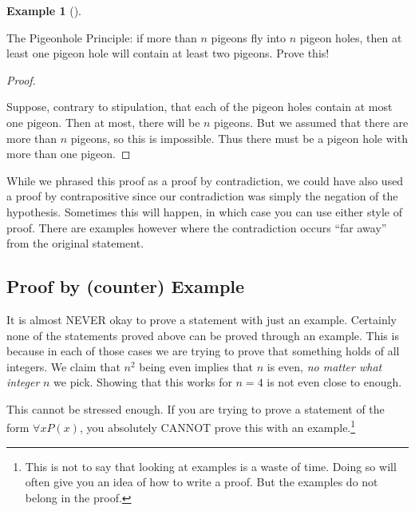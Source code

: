 \documentclass[10pt,]{book}
\theoremstyle{plain}
\theoremstyle{definition}
\newtheorem{example}[theorem]{Example}
\theoremstyle{definition}
\theoremstyle{definition}
\numberwithin{equation}{chapter}
\begin{document}
\begin{example}[]\label{example-96}

The Pigeonhole Principle: if more than \(n\) pigeons fly into \(n\) pigeon holes, then at least one pigeon hole will contain at least two pigeons. Prove this!
%
\begin{proof}\hypertarget{proof-40}{}

Suppose, contrary to stipulation, that each of the pigeon holes contain at most one pigeon. Then at most, there will be \(n\) pigeons. But we assumed that there are more than \(n\) pigeons, so this is impossible. Thus there must be a pigeon hole with more than one pigeon.
%
\end{proof}
\par

While we phrased this proof as a proof by contradiction, we could have also used a proof by contrapositive since our contradiction was simply the negation of the hypothesis. Sometimes this will happen, in which case you can use either style of proof. There are examples however where the contradiction occurs ``far away'' from the original statement.
%
\end{example}
\typeout{************************************************}
\typeout{************************************************}
\subsection[Proof by (counter) Example]{Proof by (counter) Example}\label{subsection-35}

%
\par

It is almost NEVER okay to prove a statement with just an example. Certainly none of the statements proved above can be proved through an example. This is because in each of those cases we are trying to prove that something holds of all integers. We claim that \(n^2\) being even implies that \(n\) is even, \emph{no matter what integer} \(n\) we pick. Showing that this works for \(n = 4\) is not even close to enough.
%
\par

This cannot be stressed enough. If you are trying to prove a statement of the form \(\forall x P(x)\), you absolutely CANNOT prove this with an example.\footnote{This is not to say that looking at examples is a waste of time.  Doing so will often give you an idea of how to write a proof.  But the examples do not belong in the proof.\label{fn-11}}
%
\par
\end{document}
